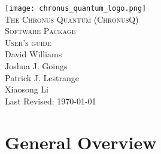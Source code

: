\documentclass[12pt]{article}
\makeatletter
\newcommand{\XiaosongContact}{Xiaosong Li (\texttt{xsli@u.washington.edu})}
\makeatother
\begin{document}
  \begin{titlepage}
    \vspace*{\fill}
    \begin{center}
      \texttt{[image: chronus\_quantum\_logo.png]}~\\[1cm]
      \textsc{\LARGE The Chronus Quantum (ChronusQ) \\ Software Package}~\\[0.5cm]
      \textsc{\Large User's guide}~\\[5cm]
      \large David Williams\\
      \large Joshua J. Goings\\
      \large Patrick J. Lestrange\\
      \large Xiaosong Li \\[1.5cm]
      \large Last Revised: \today 
    \end{center}
    \vspace*{\fill}
  \end{titlepage}
  \tableofcontents

  \newpage

  \section{General Overview} \label{sec:GeneralOverView}

%
%
\end{document}
